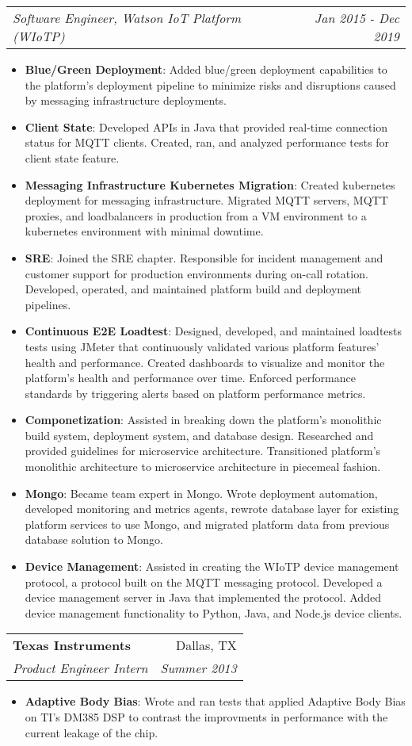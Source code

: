 \documentclass[letterpaper,11pt]{article}
\makeatletter
\newcommand{\resumeItem}[2]{
  \item\small{
    \textbf{#1}{: #2 \vspace{-2pt}}
  }
}
\newcommand{\resumeSubheading}[4]{
  \vspace{-1pt}\item
    \begin{tabular*}{0.97\textwidth}[t]{l@{\extracolsep{\fill}}r}
      \textbf{#1} & #2 \\
      \textit{\small#3} & \textit{\small #4} \\
    \end{tabular*}\vspace{-5pt}
}
\newcommand{\resumeSubheadingContinue}[2]{
  \vspace{-1pt}
    \begin{tabular*}{0.97\textwidth}[t]{l@{\extracolsep{\fill}}r}
      \textit{\small#1} & \textit{\small #2} \\
    \end{tabular*}\vspace{-5pt}
}
\newcommand{\resumeItemListStart}{\begin{itemize}}
\newcommand{\resumeItemListEnd}{\end{itemize}\vspace{-5pt}}
\makeatother
\begin{document}
      \resumeSubheadingContinue
        {Software Engineer, Watson IoT Platform (WIoTP)}{Jan 2015 - Dec 2019}
        \resumeItemListStart
          \resumeItem{Blue/Green Deployment}
            {Added blue/green deployment capabilities to the platform's deployment pipeline to minimize risks and disruptions caused by messaging infrastructure deployments.}
          \resumeItem{Client State}
            {Developed APIs in Java that provided real-time connection status for MQTT clients. Created, ran, and analyzed performance tests for client state feature.}
          \resumeItem{Messaging Infrastructure Kubernetes Migration}
            {Created kubernetes deployment for messaging infrastructure. Migrated MQTT servers, MQTT proxies, and loadbalancers in production from a VM environment to a kubernetes environment with minimal downtime.}
          \resumeItem{SRE}
            {Joined the SRE chapter. Responsible for incident management and customer support for production environments during on-call rotation. Developed, operated, and maintained platform build and deployment pipelines.}
          \resumeItem{Continuous E2E Loadtest}
            {Designed, developed, and maintained loadtests tests using JMeter that continuously validated various platform features' health and performance. Created dashboards to visualize and monitor the platform's health and performance over time. Enforced performance standards by triggering alerts based on platform performance metrics.}
          \resumeItem{Componetization}
            {Assisted in breaking down the platform's monolithic build system, deployment system, and database design. Researched and provided guidelines for microservice architecture. Transitioned platform's monolithic architecture to microservice architecture in piecemeal fashion.}
          \resumeItem{Mongo}
            {Became team expert in Mongo. Wrote deployment automation, developed monitoring and metrics agents, rewrote database layer for existing platform services to use Mongo, and migrated platform data from previous database solution to Mongo.}
          \resumeItem{Device Management}
            {Assisted in creating the WIoTP device management protocol, a protocol built on the MQTT messaging protocol. Developed a device management server in Java that implemented the protocol. Added device management functionality to Python, Java, and Node.js device clients.}
        \resumeItemListEnd
  
    \resumeSubheading
      {Texas Instruments}{Dallas, TX}
      {Product Engineer Intern}{Summer 2013}
      \resumeItemListStart
        \resumeItem{Adaptive Body Bias}
          {Wrote and ran tests that applied Adaptive Body Bias on TI's DM385 DSP to contrast the improvments in performance with the current leakage of the chip.}
      \resumeItemListEnd
\end{document}
